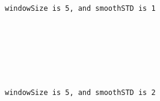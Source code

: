 \documentclass[11pt]{article}
\begin{document}
    \begin{center}
    \end{center}
    { \hspace*{\fill} \\}
    
    \begin{center}
    \end{center}
    { \hspace*{\fill} \\}
    
    \begin{Verbatim}[commandchars=\\\{\}]


windowSize is 5, and smoothSTD is 1

    \end{Verbatim}

    \begin{center}
    \end{center}
    { \hspace*{\fill} \\}
    
    \begin{center}
    \end{center}
    { \hspace*{\fill} \\}
    
    \begin{Verbatim}[commandchars=\\\{\}]


windowSize is 5, and smoothSTD is 2

    \end{Verbatim}

    \begin{center}
    \end{center}
    { \hspace*{\fill} \\}
    
    \begin{center}
    \end{center}
    { \hspace*{\fill} \\}
    
\end{document}
